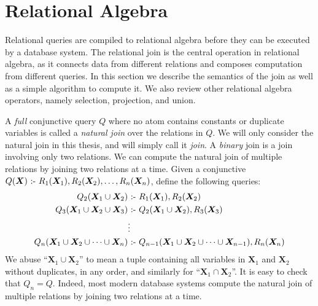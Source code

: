 \section{Relational Algebra}
\label{sec:join}

Relational queries are compiled to relational algebra 
 before they can be executed by a database system.
The relational join is the central operation in relational algebra,
 as it connects data from different relations 
 and composes computation from different queries.
In this section we describe the semantics of the join
 as well as a simple algorithm to compute it.
We also review other relational algebra operators,
 namely selection, projection, and union.

A {\em full} conjunctive query $Q$ where 
 no atom contains constants or duplicate variables
 is called a {\em natural join} over the relations in $Q$.
We will only consider the natural join in this thesis, 
 and will simply call it {\em join}.
A {\em binary} join is a join involving only two relations.
We can compute the natural join of multiple relations 
 by joining two relations at a time.
Given a conjunctive $Q(\bm{X}) \text{ :- } R_1(\bm{X}_1), R_2(\bm{X}_2), \ldots, R_n(\bm{X}_n)$,
 define the following queries:
\begin{align*}
Q_2({\bm X_1} \cup {\bm X_2}) &\text{ :- } R_1({\bm X_1}), R_2({\bm X_2})\\
Q_3({\bm X_1} \cup {\bm X_2} \cup {\bm X_3}) &\text{ :- } Q_2({\bm X_1} \cup {\bm X_2}), R_3({\bm X_3})\\
& \vdots \\
Q_n({\bm X_1} \cup {\bm X_2} \cup \cdots \cup {\bm X_n}) &\text{ :- } Q_{n-1}({\bm X_1} \cup {\bm X_2} \cup \cdots \cup {\bm X_{n-1}}), R_n({\bm X_n})
\end{align*}
We abuse ``${\bm X_1} \cup {\bm X_2}$'' to mean a tuple containing 
 all variables in ${\bm X_1}$ and ${\bm X_2}$ without duplicates, in any order, 
 and similarly for ``${\bm X_1} \cap {\bm X_2}$''.
It is easy to check that $Q_n = Q$. 
Indeed, most modern database systems compute the natural join of multiple relations 
 by joining two relations at a time. 

